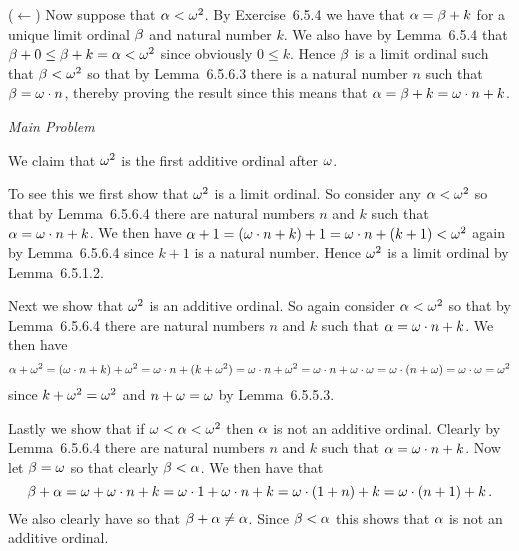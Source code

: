 \begin{solution}
{        ($\leftarrow$) Now suppose that $\alpha < \omega^2$.
        By Exercise~6.5.4 we have that $\alpha = \beta + k$ for a unique limit ordinal $\beta$ and natural number $k$.
        We also have by Lemma~6.5.4 that $\beta + 0 \leq \beta + k = \alpha < \omega^2$ since obviously $0 \leq k$.
        Hence $\beta$ is a limit ordinal such that $\beta < \omega^2$ so that by Lemma~6.5.6.3 there is a natural number $n$ such that $\beta = \omega \cdot n$, thereby proving the result since this means that $\alpha = \beta + k = \omega \cdot n + k$. \qedsymbol
    }
    
    \emph{Main Problem}

    We claim that $\omega^2$ is the first additive ordinal after $\omega$.

    To see this we first show that $\omega^2$ is a limit ordinal.
    So consider any $\alpha < \omega^2$ so that by Lemma~6.5.6.4 there are natural numbers $n$ and $k$ such that $\alpha = \omega \cdot n + k$.
    We then have $\alpha + 1 = (\omega \cdot n + k) + 1 = \omega \cdot n + (k+1) < \omega^2$ again by Lemma~6.5.6.4 since $k+1$ is a natural number.
    Hence $\omega^2$ is a limit ordinal by Lemma~6.5.1.2.

    Next we show that $\omega^2$ is an additive ordinal.
    So again consider $\alpha < \omega^2$ so that by Lemma~6.5.6.4 there are natural numbers $n$ and $k$ such that $\alpha = \omega \cdot n + k$.
    We then have
    $$
    \alpha + \omega^2 = (\omega \cdot n + k) + \omega^2 = \omega \cdot n + (k + \omega^2) = \omega \cdot n + \omega^2 = \omega \cdot n + \omega \cdot \omega
    = \omega \cdot (n + \omega) = \omega \cdot \omega = \omega^2
    $$
    since $k + \omega^2 = \omega^2$ and $n + \omega = \omega$ by Lemma~6.5.5.3.

    Lastly we show that if $\omega < \alpha < \omega^2$ then $\alpha$ is not an additive ordinal.
    Clearly by Lemma~6.5.6.4 there are natural numbers $n$ and $k$ such that $\alpha = \omega \cdot n + k$.
    Now let $\beta = \omega$ so that clearly $\beta < \alpha$.
    We then have that
    $$
    \beta + \alpha = \omega + \omega \cdot n + k = \omega \cdot 1 + \omega \cdot n + k = \omega \cdot (1 + n) + k = \omega \cdot (n+1) + k \,.
    $$
    We also clearly have
    so that $\beta + \alpha \neq \alpha$.
    Since $\beta < \alpha$ this shows that $\alpha$ is not an additive ordinal. \qedsymbol
\end{solution}



